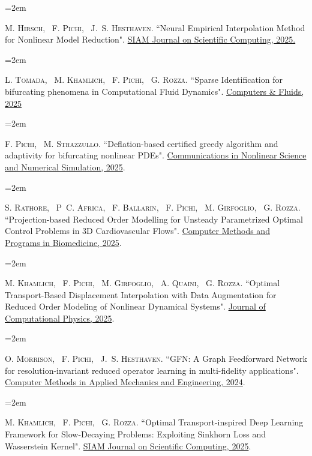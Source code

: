 \documentclass[
  usegeometry%
]{scrartcl}
\newcommand{\MarginText}[1]{\marginpar{\raggedleft\itshape\small#1}} %
\newcommand{\Description}[1]{\hangindent=2em\hangafter=0\noindent\raggedright\footnotesize{#1}\par\normalsize\vspace{1em}} %
\begin{document}
\begin{cv}{}
\Description{\MarginText{[16]}M. \textsc{Hirsch}, ~F. \textsc{Pichi}, ~J.~S. \textsc{Hesthaven.} {\color{blue} ``Neural Empirical Interpolation Method for Nonlinear Model Reduction".} \href{https://doi.org/10.1137/24M1681434}{ SIAM Journal on Scientific Computing, 2025.}}

\Description{\MarginText{[15]}L. \textsc{Tomada}, ~M. \textsc{Khamlich}, ~F. \textsc{Pichi}, ~G. \textsc{Rozza.} {\color{blue} ``Sparse Identification for bifurcating phenomena in Computational Fluid Dynamics".} \href{https://doi.org/10.1016/j.compfluid.2025.106841}{ Computers \& Fluids, 2025}}


\Description{\MarginText{[14]}F. \textsc{Pichi}, ~M. \textsc{Strazzullo.} {\color{blue} ``Deflation-based certified greedy algorithm and adaptivity for bifurcating nonlinear PDEs".} \href{https://www.sciencedirect.com/science/article/pii/S1007570425003521?ref=pdf_download&fr=RR-2&rr=943afc19bb76edcb}{ Communications in Nonlinear Science and Numerical Simulation, 2025}.}


\Description{\MarginText{[13]}S. \textsc{Rathore}, ~P~C. \textsc{Africa}, ~F. \textsc{Ballarin}, ~F. \textsc{Pichi}, ~M. \textsc{Girfoglio}, ~G. \textsc{Rozza.} {\color{blue} ``Projection-based Reduced Order Modelling for Unsteady Parametrized Optimal Control Problems in 3D Cardiovascular Flows".} \href{https://www.sciencedirect.com/science/article/pii/S0169260725002305}{ Computer Methods and Programs in Biomedicine, 2025}.}


\Description{\MarginText{[12]}M. \textsc{Khamlich}, ~F. \textsc{Pichi}, ~M. \textsc{Girfoglio}, ~A. \textsc{Quaini}, ~G. \textsc{Rozza.} {\color{blue} ``Optimal Transport-Based Displacement Interpolation with Data Augmentation for Reduced Order Modeling of Nonlinear Dynamical Systems".} \href{https://www.sciencedirect.com/science/article/pii/S0021999125002219?dgcid=author}{ Journal of Computational Physics, 2025}.}

\Description{\MarginText{[11]}O. \textsc{Morrison}, ~F. \textsc{Pichi}, ~J.~S. \textsc{Hesthaven.}  {\color{blue} ``GFN: A Graph Feedforward Network for resolution-invariant reduced operator learning in multi-fidelity applications".} \href{https://doi.org/10.1016/j.cma.2024.117458}{Computer Methods in Applied Mechanics and Engineering, 2024}.}

\Description{\MarginText{[10]}M. \textsc{Khamlich}, ~F. \textsc{Pichi}, ~G. \textsc{Rozza.} {\color{blue} ``Optimal Transport-inspired Deep Learning Framework for Slow-Decaying Problems: Exploiting Sinkhorn Loss and Wasserstein Kernel".} \href{https://epubs.siam.org/doi/10.1137/23M1604680}{SIAM Journal on Scientific Computing, 2025}.}


\end{cv}
\end{document}
